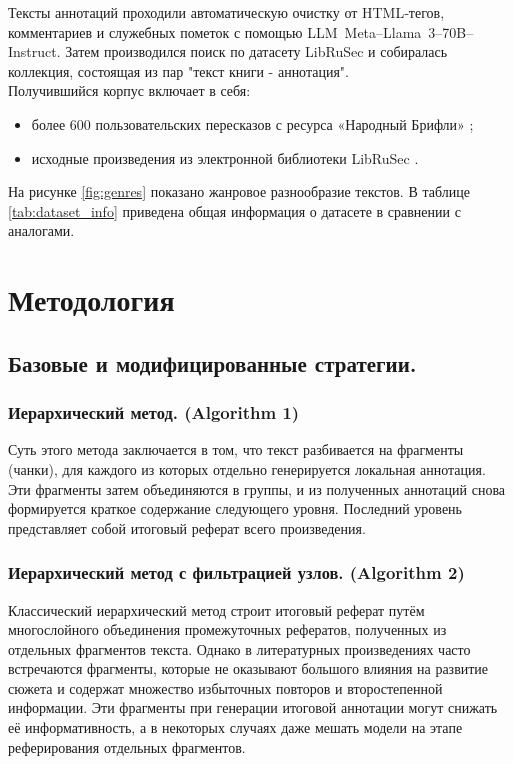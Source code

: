 \documentclass{article}
\begin{document}
Тексты аннотаций проходили автоматическую очистку от HTML‑тегов, комментариев и служебных пометок с помощью LLM~Meta--Llama~3--70B--Instruct. 
Затем производился поиск по датасету LibRuSec и собиралась коллекция, состоящая из пар "текст книги - аннотация".
\\Получившийся корпус включает в себя:
\begin{itemize}
  \item более 600 пользовательских пересказов с ресурса «Народный Брифли» \cite{Briefly};
  \item исходные произведения из электронной библиотеки LibRuSec \cite{librusec}.
\end{itemize}

На рисунке \ref{fig:genres} показано жанровое разнообразие текстов. В таблице \ref{tab:dataset_info} приведена общая информация о датасете в сравнении с аналогами.

\section*{Методология}
\subsection*{Базовые и модифицированные стратегии.}

\subsubsection*{Иерархический метод. (Algorithm 1)}
Суть этого метода \cite{hierarchical} заключается в том, что текст разбивается на фрагменты (чанки), для каждого из
которых отдельно генерируется локальная аннотация. 
Эти фрагменты затем объединяются в группы, и из полученных аннотаций снова формируется краткое содержание
следующего уровня. Последний уровень представляет собой итоговый реферат всего произведения.

\subsubsection*{Иерархический метод с фильтрацией узлов. (Algorithm 2)}
Классический иерархический метод строит итоговый реферат путём многослойного объединения промежуточных рефератов, полученных из отдельных фрагментов текста. 
Однако в литературных произведениях часто встречаются фрагменты, которые не оказывают большого влияния на развитие сюжета и содержат множество избыточных
повторов и второстепенной информации. Эти фрагменты при генерации итоговой аннотации могут снижать её информативность, а в некоторых случаях даже мешать модели на этапе реферирования отдельных фрагментов.
\end{document}
